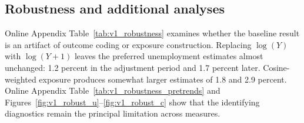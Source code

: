 \subsection{Robustness and additional analyses}
\label{sec:v1_robustness}

Online Appendix Table~\ref{tab:v1_robustness} examines whether the baseline result is an artifact of outcome coding or exposure construction. Replacing \(\log(Y)\) with \(\log(Y+1)\) leaves the preferred unemployment estimates almost unchanged: 1.2 percent in the adjustment period and 1.7 percent later. Cosine-weighted exposure produces somewhat larger estimates of 1.8 and 2.9 percent. %
Online Appendix Table~\ref{tab:v1_robustness_pretrends} and Figures~\ref{fig:v1_robust_u}--\ref{fig:v1_robust_c} show that the identifying diagnostics remain the principal limitation across measures.%


